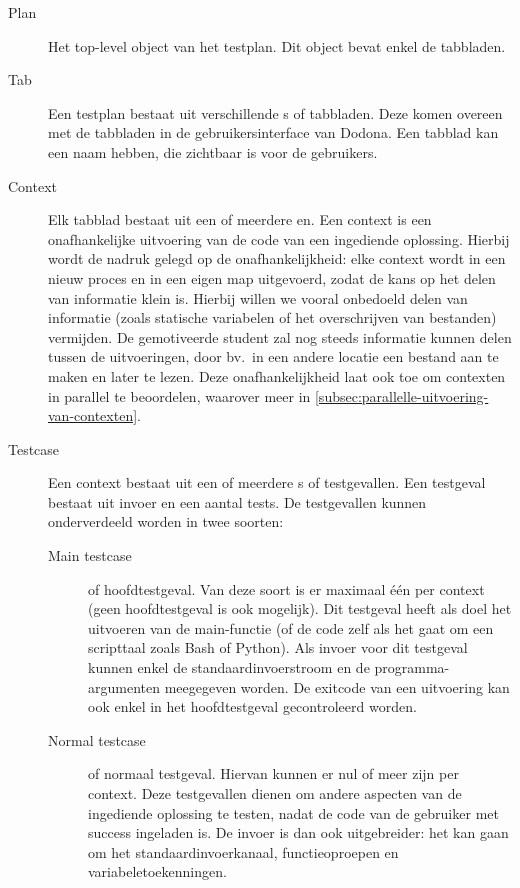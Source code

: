 \begin{description}
    \item[Plan] Het top-level object van het testplan.
    Dit object bevat enkel de tabbladen.
    \item[Tab] Een testplan bestaat uit verschillende s of tabbladen.
    Deze komen overeen met de tabbladen in de gebruikersinterface van Dodona.
    Een tabblad kan een naam hebben, die zichtbaar is voor de gebruikers.
    \item[Context] Elk tabblad bestaat uit een of meerdere en.
    Een context is een onafhankelijke uitvoering van de code van een ingediende oplossing.
    Hierbij wordt de nadruk gelegd op de onafhankelijkheid: elke context wordt in een nieuw proces en in een eigen map uitgevoerd, zodat de kans op het delen van informatie klein is.
    Hierbij willen we vooral onbedoeld delen van informatie (zoals statische variabelen of het overschrijven van bestanden) vermijden.
    De gemotiveerde student zal nog steeds informatie kunnen delen tussen de uitvoeringen, door bv.\ in een andere locatie een bestand aan te maken en later te lezen.
    Deze onafhankelijkheid laat ook toe om contexten in parallel te beoordelen, waarover meer in \cref{subsec:parallelle-uitvoering-van-contexten}.
    \item[Testcase] Een context bestaat uit een of meerdere s of testgevallen.
    Een testgeval bestaat uit invoer en een aantal tests.
    De testgevallen kunnen onderverdeeld worden in twee soorten:
    \begin{description}
        \item[Main testcase] of hoofdtestgeval.
        Van deze soort is er maximaal één per context (geen hoofdtestgeval is ook mogelijk).
        Dit testgeval heeft als doel het uitvoeren van de main-functie (of de code zelf als het gaat om een scripttaal zoals Bash of Python).
        Als invoer voor dit testgeval kunnen enkel de standaardinvoerstroom en de programma-argumenten meegegeven worden.
        De exitcode van een uitvoering kan ook enkel in het hoofdtestgeval gecontroleerd worden.
        \item[Normal testcase] of normaal testgeval.
        Hiervan kunnen er nul of meer zijn per context.
        Deze testgevallen dienen om andere aspecten van de ingediende oplossing te testen, nadat de code van de gebruiker met success ingeladen is.
        De invoer is dan ook uitgebreider: het kan gaan om het standaardinvoerkanaal, functieoproepen en variabeletoekenningen.

\end{description}
\end{description}
